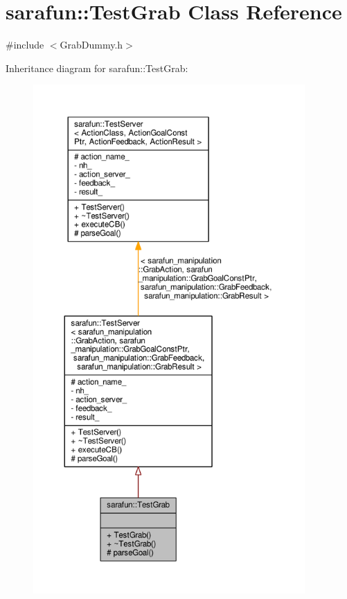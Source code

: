 \hypertarget{classsarafun_1_1TestGrab}{\section{sarafun\-:\-:Test\-Grab Class Reference}
\label{classsarafun_1_1TestGrab}
}


{\ttfamily \#include $<$Grab\-Dummy.\-h$>$}



Inheritance diagram for sarafun\-:\-:Test\-Grab\-:
\nopagebreak
\begin{figure}[H]
\begin{center}
\leavevmode
\includegraphics[height=550pt]{dc/d55/classsarafun_1_1TestGrab__inherit__graph}
\end{center}
\end{figure}


